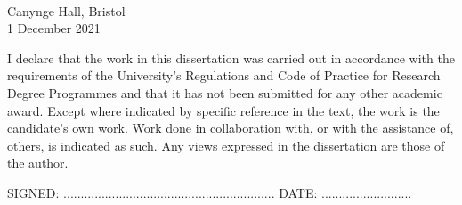 \documentclass[a4paper, twoside]{templates/ociamthesis}
\begin{document}
\begin{romanpages}
\begin{acknowledgements}
  ~
  ~
  ~
  ~
  ~
  ~
  ~
  ~

  \begin{flushright}
  Canynge Hall, Bristol \\1 December 2021
  \end{flushright}
\end{acknowledgements}

\begin{declaration}
 	I declare that the work in this dissertation was carried out in accordance with the requirements of the University's Regulations and Code of Practice for Research Degree Programmes and that it has not been submitted for any other academic award. Except where indicated by specific reference in the text, the work is the candidate's own work. Work done in collaboration with, or with the assistance of, others, is indicated as such. Any views expressed in the dissertation are those of the author.

  \bigskip
  \bigskip

  \begin{flushright}
  SIGNED: .............................................................         DATE: ..........................\\
  \end{flushright}
\end{declaration}

% 
  \dominitoc %

\flushbottom

\tableofcontents

\listoffigures
	\mtcaddchapter

\listoftables
  \mtcaddchapter


\end{romanpages}
\end{document}
